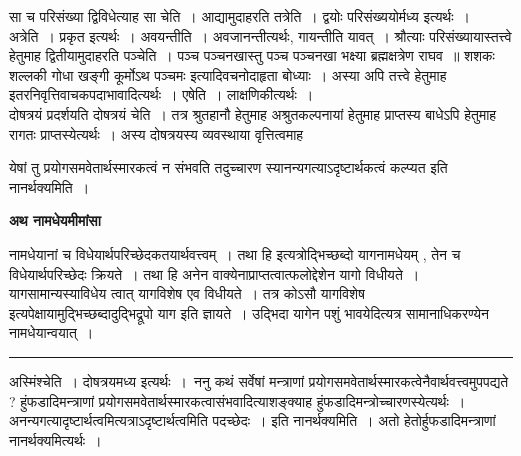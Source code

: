 \documentclass[11pt, openany]{book}
\newcommand\alfootnote[1]{%
  \begingroup
  \renewcommand\thefootnoteA{}\footnoteA{#1}%
  \addtocounter{footnoteA}{-1}%
  \endgroup
}
\begin{document}
 सा च परिसंख्या द्विविधेत्याह  {\br सा चेति~।} आद्यामुदाहरति {\br तत्रेति~।}  द्वयोः परिसंख्ययोर्मध्य इत्यर्थः~। {\br अत्रेति~।} प्रकृत इत्यर्थः~। अवयन्तीति~। अवजानन्तीत्यर्थः, गायन्तीति यावत्~। श्रौत्याः परिसंख्यायास्तत्त्वे हेतुमाह द्वितीयामुदाहरति  {\br पञ्चेति~।} पञ्च पञ्चनखास्तु {\ab  पञ्च पञ्चनखा भक्ष्या ब्रह्मक्षत्रेण राघव~॥ शशकः शल्लकी गोधा खङ्गी कूर्मोऽथ पञ्चमः}  इत्यादिवचनोदाहृता बोध्याः~। अस्या अपि तत्त्वे हेतुमाह  इतरनिवृत्तिवाचकपदाभावादित्यर्थः~। {\br एषेति~।} लाक्षणिकीत्यर्थः~।~\\

 दोषत्रयं प्रदर्शयति  {\br दोषत्रयं चेति~।} तत्र श्रुतहानौ हेतुमाह  अश्रुतकल्पनायां हेतुमाह  प्राप्तस्य बाधेऽपि हेतुमाह रागतः प्राप्तस्येत्यर्थः~। अस्य दोषत्रयस्य व्यवस्थाया वृत्तित्वमाह\textendash
\alfootnote{टिप्प०\textemdash\ $^{1}$प्रकल्पनादिति पाठो भाति~।~}
\newpage
\fancyhead[RE]{[नामधेयमीमांसा ]}
{\bl\noindent येषां तु प्रयोगसमवेतार्थस्मारकत्वं न संभवति तदुच्चारण  स्यानन्यगत्याऽदृष्टार्थकत्वं कल्प्यत इति नानर्थक्यमिति~।}
\begin{center}
  \textbf{अथ नामधेयमीमांसा }  
\end{center}

{\bl नामधेयानां च विधेयार्थपरिच्छेदकतयार्थवत्त्वम्~। तथा हि इत्यत्रोद्भिच्छब्दो यागनामधेयम् ,  तेन च विधेयार्थपरिच्छेदः क्रियते~। तथा हि \textendash अनेन वाक्येनाप्राप्तत्वात्फलोद्देशेन यागो विधीयते~। यागसामान्यस्याविधेय  त्वात् यागविशेष एव विधीयते~। तत्र कोऽसौ यागविशेष 
इत्यपेक्षायामुद्भिच्छब्दादुद्भिद्रूपो याग इति ज्ञायते~। उद्भिदा  यागेन पशुं भावयेदित्यत्र सामानाधिकरण्येन नामधेयान्वयात्~।~}\\
\hrule
\vspace{3mm}
\noindent
{\br अस्मिंश्चेति~।} दोषत्रयमध्य इत्यर्थः~।~{\br ननु} कथं {\br सर्वेषां} मन्त्राणां प्रयोगसमवेतार्थस्मारकत्वेनैवार्थवत्त्वमुपपद्यते ? हुंफडादिमन्त्राणां प्रयोगसमवेतार्थस्मारकत्वासंभवादित्याशङ्क्याह  हुंफडादिमन्त्रोच्चारणस्येत्यर्थः~। अनन्यगत्यादृष्टार्थत्वमित्यत्राऽदृष्टार्थत्वमिति पदच्छेदः~। {\br इति नानर्थक्यमिति~।} अतो हेतोर्हुफडादिमन्त्राणां नानर्थक्यमित्यर्थः~।\\
\end{document}
